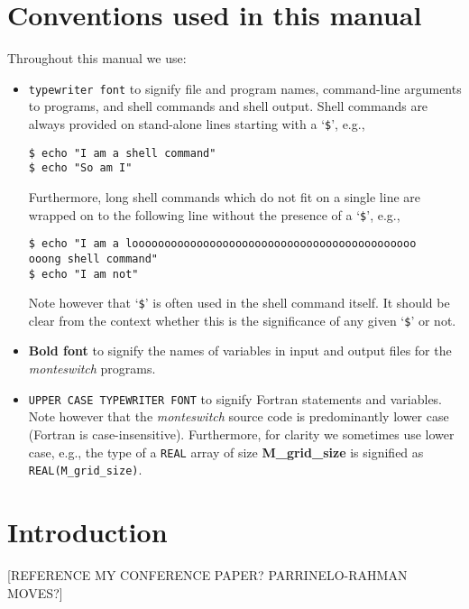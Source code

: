\documentclass{report}
\begin{document}
\chapter*{Conventions used in this manual}
Throughout this manual we use:
\begin{itemize}
\item \texttt{typewriter font} to signify file and program names, command-line arguments to programs, and shell
commands and shell output. Shell commands are always provided on stand-alone lines starting with a `\verb|$|', e.g.,
\begin{verbatim}
$ echo "I am a shell command"
$ echo "So am I"
\end{verbatim}
Furthermore, long shell commands which do not fit on a single line are wrapped on to the following line without the presence of
a `\verb|$|', e.g.,
\begin{verbatim}
$ echo "I am a loooooooooooooooooooooooooooooooooooooooooooo
ooong shell command"
$ echo "I am not"
\end{verbatim}
Note however that `\verb|$|' is often used in the shell command itself. It should be clear from the context whether this is the
significance of any given `\verb|$|' or not.
\item \textbf{Bold font} to signify the names of variables in input and output files for the \emph{monteswitch} programs.
\item \texttt{UPPER CASE TYPEWRITER FONT} to signify Fortran statements and variables. Note however that the \emph{monteswitch} 
source code is predominantly lower case (Fortran is case-insensitive). Furthermore, for clarity we sometimes use lower case, e.g.,
the type of a \texttt{REAL} array of size \textbf{M\_grid\_size} is signified as \texttt{REAL(M\_grid\_size)}.
\end{itemize}


\chapter{Introduction}
[REFERENCE MY CONFERENCE PAPER? PARRINELO-RAHMAN MOVES?]
\end{document}
